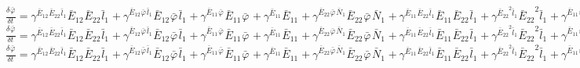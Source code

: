 $\frac{{\delta}^{} {\bar{\varphi}}_{}}{{\delta} {{{t}}_{}}^{}} = {\gamma}^{{{{\bar{E}}_{12}}^{}{{\bar{E}}_{22}}^{}{{\bar{l}}_{1}}^{}}}{{{\bar{E}}_{12}}^{}{{\bar{E}}_{22}}^{}{{\bar{l}}_{1}}^{}} + {\gamma}^{{{{\bar{E}}_{12}}^{}{{\bar{\varphi}}_{}}^{}{{\bar{l}}_{1}}^{}}}{{{\bar{E}}_{12}}^{}{{\bar{\varphi}}_{}}^{}{{\bar{l}}_{1}}^{}} + {\gamma}^{{{{\bar{E}}_{11}}^{}{{\bar{\varphi}}_{}}^{}}}{{{\bar{E}}_{11}}^{}{{\bar{\varphi}}_{}}^{}} + {\gamma}^{{{{\bar{E}}_{11}}^{}}}{{{\bar{E}}_{11}}^{}} + {\gamma}^{{{{\bar{E}}_{22}}^{}{{\bar{\varphi}}_{}}^{}{{\bar{N}}_{1}}^{}}}{{{\bar{E}}_{22}}^{}{{\bar{\varphi}}_{}}^{}{{\bar{N}}_{1}}^{}} + {\gamma}^{{{{\bar{E}}_{11}}^{}{{\bar{E}}_{22}}^{}{{\bar{l}}_{1}}^{}}}{{{\bar{E}}_{11}}^{}{{\bar{E}}_{22}}^{}{{\bar{l}}_{1}}^{}} + {\gamma}^{{{{\bar{E}}_{22}}^{2}{{\bar{l}}_{1}}^{}}}{{{\bar{E}}_{22}}^{2}{{\bar{l}}_{1}}^{}} + {\gamma}^{{{{\bar{E}}_{11}}^{}{{\bar{\varphi}}_{}}^{}{{\bar{l}}_{1}}^{}}}{{{\bar{E}}_{11}}^{}{{\bar{\varphi}}_{}}^{}{{\bar{l}}_{1}}^{}} + {\gamma}^{{{{\bar{E}}_{11}}^{}{{\bar{\varphi}}_{}}^{}{{\bar{l}}_{2}}^{}}}{{{\bar{E}}_{11}}^{}{{\bar{\varphi}}_{}}^{}{{\bar{l}}_{2}}^{}} + {\gamma}^{{{{\bar{E}}_{22}}^{}{{\bar{\varphi}}_{}}^{}{{\bar{l}}_{2}}^{}}}{{{\bar{E}}_{22}}^{}{{\bar{\varphi}}_{}}^{}{{\bar{l}}_{2}}^{}}$
$\frac{{\delta}^{} {\bar{\varphi}}_{}}{{\delta} {{{t}}_{}}^{}} = {\gamma}^{{{{\bar{E}}_{12}}^{}{{\bar{E}}_{22}}^{}{{\bar{l}}_{1}}^{}}}{{{\bar{E}}_{12}}^{}{{\bar{E}}_{22}}^{}{{\bar{l}}_{1}}^{}} + {\gamma}^{{{{\bar{E}}_{12}}^{}{{\bar{\varphi}}_{}}^{}{{\bar{l}}_{1}}^{}}}{{{\bar{E}}_{12}}^{}{{\bar{\varphi}}_{}}^{}{{\bar{l}}_{1}}^{}} + {\gamma}^{{{{\bar{E}}_{11}}^{}{{\bar{\varphi}}_{}}^{}}}{{{\bar{E}}_{11}}^{}{{\bar{\varphi}}_{}}^{}} + {\gamma}^{{{{\bar{E}}_{11}}^{}}}{{{\bar{E}}_{11}}^{}} + {\gamma}^{{{{\bar{E}}_{22}}^{}{{\bar{\varphi}}_{}}^{}{{\bar{N}}_{1}}^{}}}{{{\bar{E}}_{22}}^{}{{\bar{\varphi}}_{}}^{}{{\bar{N}}_{1}}^{}} + {\gamma}^{{{{\bar{E}}_{11}}^{}{{\bar{E}}_{22}}^{}{{\bar{l}}_{1}}^{}}}{{{\bar{E}}_{11}}^{}{{\bar{E}}_{22}}^{}{{\bar{l}}_{1}}^{}} + {\gamma}^{{{{\bar{E}}_{22}}^{2}{{\bar{l}}_{1}}^{}}}{{{\bar{E}}_{22}}^{2}{{\bar{l}}_{1}}^{}} + {\gamma}^{{{{\bar{E}}_{11}}^{}{{\bar{\varphi}}_{}}^{}{{\bar{l}}_{1}}^{}}}{{{\bar{E}}_{11}}^{}{{\bar{\varphi}}_{}}^{}{{\bar{l}}_{1}}^{}} + {\gamma}^{{{{\bar{E}}_{11}}^{}{{\bar{\varphi}}_{}}^{}{{\bar{l}}_{2}}^{}}}{{{\bar{E}}_{11}}^{}{{\bar{\varphi}}_{}}^{}{{\bar{l}}_{2}}^{}}$
$\frac{{\delta}^{} {\bar{\varphi}}_{}}{{\delta} {{{t}}_{}}^{}} = {\gamma}^{{{{\bar{E}}_{12}}^{}{{\bar{E}}_{22}}^{}{{\bar{l}}_{1}}^{}}}{{{\bar{E}}_{12}}^{}{{\bar{E}}_{22}}^{}{{\bar{l}}_{1}}^{}} + {\gamma}^{{{{\bar{E}}_{12}}^{}{{\bar{\varphi}}_{}}^{}{{\bar{l}}_{1}}^{}}}{{{\bar{E}}_{12}}^{}{{\bar{\varphi}}_{}}^{}{{\bar{l}}_{1}}^{}} + {\gamma}^{{{{\bar{E}}_{11}}^{}{{\bar{\varphi}}_{}}^{}}}{{{\bar{E}}_{11}}^{}{{\bar{\varphi}}_{}}^{}} + {\gamma}^{{{{\bar{E}}_{11}}^{}}}{{{\bar{E}}_{11}}^{}} + {\gamma}^{{{{\bar{E}}_{22}}^{}{{\bar{\varphi}}_{}}^{}{{\bar{N}}_{1}}^{}}}{{{\bar{E}}_{22}}^{}{{\bar{\varphi}}_{}}^{}{{\bar{N}}_{1}}^{}} + {\gamma}^{{{{\bar{E}}_{11}}^{}{{\bar{E}}_{22}}^{}{{\bar{l}}_{1}}^{}}}{{{\bar{E}}_{11}}^{}{{\bar{E}}_{22}}^{}{{\bar{l}}_{1}}^{}} + {\gamma}^{{{{\bar{E}}_{22}}^{2}{{\bar{l}}_{1}}^{}}}{{{\bar{E}}_{22}}^{2}{{\bar{l}}_{1}}^{}} + {\gamma}^{{{{\bar{E}}_{11}}^{}{{\bar{\varphi}}_{}}^{}{{\bar{l}}_{1}}^{}}}{{{\bar{E}}_{11}}^{}{{\bar{\varphi}}_{}}^{}{{\bar{l}}_{1}}^{}}$
